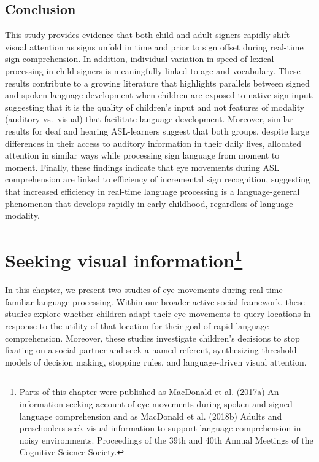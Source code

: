 \documentclass[oneside]{report}
\begin{document}
\section{Conclusion}\label{conclusion}

This study provides evidence that both child and adult signers rapidly
shift visual attention as signs unfold in time and prior to sign offset
during real-time sign comprehension. In addition, individual variation
in speed of lexical processing in child signers is meaningfully linked
to age and vocabulary. These results contribute to a growing literature
that highlights parallels between signed and spoken language development
when children are exposed to native sign input, suggesting that it is
the quality of children's input and not features of modality (auditory
vs.~visual) that facilitate language development. Moreover, similar
results for deaf and hearing ASL-learners suggest that both groups,
despite large differences in their access to auditory information in
their daily lives, allocated attention in similar ways while processing
sign language from moment to moment. Finally, these findings indicate
that eye movements during ASL comprehension are linked to efficiency of
incremental sign recognition, suggesting that increased efficiency in
real-time language processing is a language-general phenomenon that
develops rapidly in early childhood, regardless of language modality.

\chapter[Seeking visual information]{\texorpdfstring{Seeking visual
information\footnote{Parts of this chapter were published as MacDonald
  et al. (2017a) An information-seeking account of eye movements during
  spoken and signed language comprehension and as MacDonald et al.
  (2018b) Adults and preschoolers seek visual information to support
  language comprehension in noisy environments. Proceedings of the 39th
  and 40th Annual Meetings of the Cognitive Science Society.}}{Seeking visual information}}\label{seeking-visual-information}

In this chapter, we present two studies of eye movements during
real-time familiar language processing. Within our broader active-social
framework, these studies explore whether children adapt their eye
movements to query locations in response to the utility of that location
for their goal of rapid language comprehension. Moreover, these studies
investigate children's decisions to stop fixating on a social partner
and seek a named referent, synthesizing threshold models of decision
making, stopping rules, and language-driven visual attention.
\end{document}
